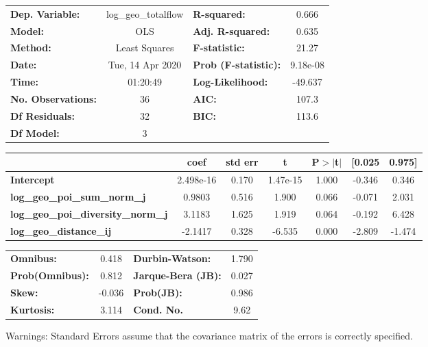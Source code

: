 \begin{center}
\begin{tabular}{lclc}
\toprule
\textbf{Dep. Variable:}                    & log\_geo\_totalflow & \textbf{  R-squared:         } &     0.666   \\
\textbf{Model:}                            &         OLS         & \textbf{  Adj. R-squared:    } &     0.635   \\
\textbf{Method:}                           &    Least Squares    & \textbf{  F-statistic:       } &     21.27   \\
\textbf{Date:}                             &   Tue, 14 Apr 2020  & \textbf{  Prob (F-statistic):} &  9.18e-08   \\
\textbf{Time:}                             &       01:20:49      & \textbf{  Log-Likelihood:    } &   -49.637   \\
\textbf{No. Observations:}                 &            36       & \textbf{  AIC:               } &     107.3   \\
\textbf{Df Residuals:}                     &            32       & \textbf{  BIC:               } &     113.6   \\
\textbf{Df Model:}                         &             3       & \textbf{                     } &             \\
\bottomrule
\end{tabular}
\begin{tabular}{lcccccc}
                                           & \textbf{coef} & \textbf{std err} & \textbf{t} & \textbf{P$> |$t$|$} & \textbf{[0.025} & \textbf{0.975]}  \\
\midrule
\textbf{Intercept}                         &    2.498e-16  &        0.170     &  1.47e-15  &         1.000        &       -0.346    &        0.346     \\
\textbf{log\_geo\_poi\_sum\_norm\_j}       &       0.9803  &        0.516     &     1.900  &         0.066        &       -0.071    &        2.031     \\
\textbf{log\_geo\_poi\_diversity\_norm\_j} &       3.1183  &        1.625     &     1.919  &         0.064        &       -0.192    &        6.428     \\
\textbf{log\_geo\_distance\_ij}            &      -2.1417  &        0.328     &    -6.535  &         0.000        &       -2.809    &       -1.474     \\
\bottomrule
\end{tabular}
\begin{tabular}{lclc}
\textbf{Omnibus:}       &  0.418 & \textbf{  Durbin-Watson:     } &    1.790  \\
\textbf{Prob(Omnibus):} &  0.812 & \textbf{  Jarque-Bera (JB):  } &    0.027  \\
\textbf{Skew:}          & -0.036 & \textbf{  Prob(JB):          } &    0.986  \\
\textbf{Kurtosis:}      &  3.114 & \textbf{  Cond. No.          } &     9.62  \\
\bottomrule
\end{tabular}
\end{center}

Warnings: \newline
 [1] Standard Errors assume that the covariance matrix of the errors is correctly specified.